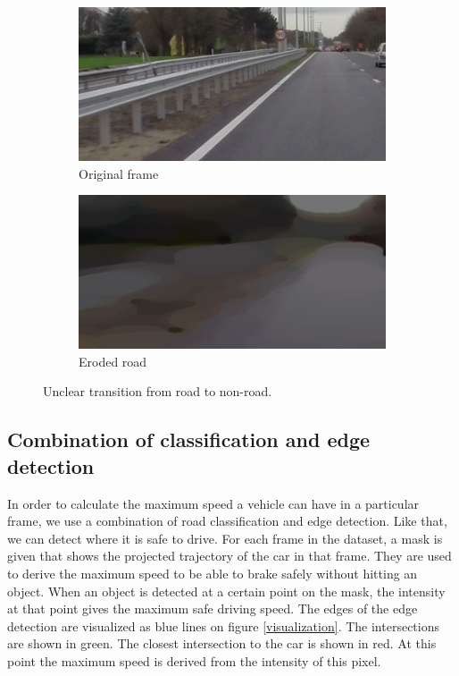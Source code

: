 \documentclass[runningheads,a4paper]{llncs}
\begin{document}
\begin{figure}[ht]
\centering
\begin{subfigure}{.5\textwidth}
  \centering
  \includegraphics[width=.9\textwidth]{fig/transition_road_dirt_original.png}
  \caption{Original frame\label{transition_road_dirt_original}}
\end{subfigure}%
\begin{subfigure}{.5\textwidth}
  \centering
  \includegraphics[width=.9\textwidth]{fig/transition_road_dirt_eroded.png}
  \caption{Eroded road\label{transition_road_dirt_eroded}}
\end{subfigure}
\caption{Unclear transition from road to non-road.}
\end{figure}

\subsection{Combination of classification and edge detection}\label{method-combination}

In order to calculate the maximum speed a vehicle can have in a particular frame, we use a combination of road classification and edge detection. Like that, we can detect where it is safe to drive. For each frame in the dataset, a mask is given that shows the projected trajectory of the car in that frame. They are used to derive the maximum speed to be able to brake safely without hitting an object. When an object is detected at a certain point on the mask, the intensity at that point gives the maximum safe driving speed. The edges of the edge detection are visualized as blue lines on figure \ref{visualization}. The intersections are shown in green. The closest intersection to the car is shown in red. At this point the maximum speed is derived from the intensity of this pixel. 
\end{document}
